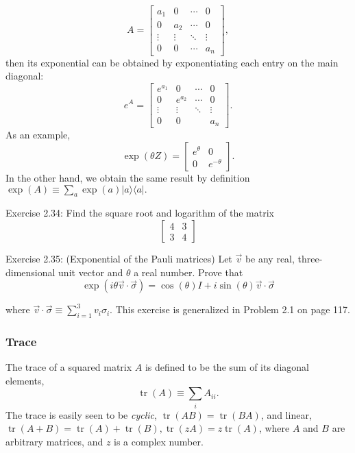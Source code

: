 $$
A=\left[\begin{array}{cccc}
a_1 & 0 & \cdots & 0 \\
0 & a_2 & \cdots & 0 \\
\vdots & \vdots & \ddots & \vdots \\
0 & 0 & \cdots & a_n
\end{array}\right],
$$
then its exponential can be obtained by exponentiating each entry on the main diagonal:
$$
e^A=\left[\begin{array}{cccc}
e^{a_1} & 0 & \cdots & 0 \\
0 & e^{a_2} & \cdots & 0 \\
\vdots & \vdots & \ddots & \vdots \\
0 & 0 & & a_n
\end{array}\right] .
$$
As an example,
$$
\exp (\theta Z)=\left[\begin{array}{cc}
e^{\theta} & 0 \\
0 & e^{-\theta}
\end{array}\right].
$$
In the other hand, we obtain the same result by definition $\exp (A) \equiv \sum_{a} \exp (a)|a\rangle\langle a|.$

\begin{exercise}
Exercise 2.34: Find the square root and logarithm of the matrix
$$
\left[\begin{array}{ll}
4 & 3 \\
3 & 4
\end{array}\right]
$$
\end{exercise}

\begin{exercise}
Exercise 2.35: (Exponential of the Pauli matrices) Let $\vec{v}$ be any real, three-dimensional unit vector and $\theta$ a real number. Prove that
$$
\exp (i \theta \vec{v} \cdot \vec{\sigma})=\cos (\theta) I+i \sin (\theta) \vec{v} \cdot \vec{\sigma}
$$

where $\vec{v} \cdot \vec{\sigma} \equiv \sum_{i=1}^{3} v_{i} \sigma_{i}$. This exercise is generalized in Problem 2.1 on page 117.
\end{exercise}

\subsubsection{Trace}

The trace of a squared matrix $A$ is defined to be the sum of its diagonal elements,
$$
\operatorname{tr}(A) \equiv \sum_{i} A_{i i}.
$$
The trace is easily seen to be \textit{cyclic}, $\operatorname{tr}(A B)=\operatorname{tr}(B A)$, and linear, $\operatorname{tr}(A+B)=\operatorname{tr}(A)+\operatorname{tr}(B), \operatorname{tr}(z A)=z \operatorname{tr}(A)$, where $A$ and $B$ are arbitrary matrices, and $z$ is a complex number. 


